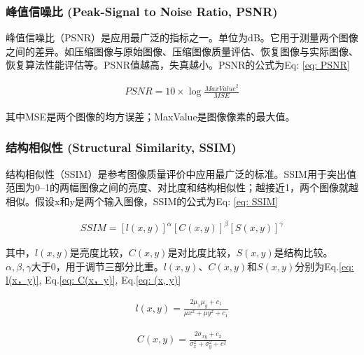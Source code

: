 \documentclass[letterpaper,12pt]{article}
\begin{document}
			\subsubsection{峰值信噪比 (Peak-Signal to Noise Ratio, PSNR)}
		
			峰值信噪比（PSNR）是应用最广泛的指标之一。单位为dB。它用于测量两个图像之间的差异。如压缩图像与原始图像、压缩图像质量评估、恢复图像与实际图像、恢复算法性能评估等。PSNR值越高，失真越小。PSNR的公式为Eq: \ref{eq: PSNR}
			
			\begin{equation}
				\begin{aligned}
					PSNR = 10 \times \log \frac{{MaxValue}^2}{MSE}
				\end{aligned}
				\label{eq: PSNR}
			\end{equation}
			
			其中MSE是两个图像的均方误差；MaxValue是图像像素的最大值。
			
			\subsubsection{结构相似性 (Structural Similarity, SSIM)}
			
			结构相似性（SSIM）是参考图像质量评价中应用最广泛的标准。SSIM用于突出值范围为0–1的两幅图像之间的亮度、对比度和结构相似性；越接近1，两个图像就越相似。假设x和y是两个输入图像，SSIM的公式为Eq: \ref{eq: SSIM}
	
			\begin{equation}
				\begin{aligned}
					SSIM = {\left[ l(x,y) \right]}^{\alpha} {\left[C(x,y)\right]}^\beta {\left[S(x,y)\right]}^\gamma
				\end{aligned}
				\label{eq: SSIM}
			\end{equation}
	
			其中，$l(x,y)$是亮度比较，$C(x,y)$是对比度比较，$S(x,y)$是结构比较。$\alpha, \beta, \gamma$大于$0$，用于调节三部分比重。$l(x, y)$、$C(x, y)$和$S(x, y)$分别为Eq.\ref{eq: l(x，y)}, Eq.\ref{eq: C(x，y)}, Eq.\ref{eq: (x, y)}
			
			\begin{equation}
				\begin{aligned}
					l(x,y)=\frac{2\mu_x \mu_y + c_1}{\mu x^2 + \mu y^2 + c_1}
				\end{aligned}
				\label{eq: l(x，y)}
			\end{equation}
			
			\begin{equation}
				\begin{aligned}
					C(x,y) = \frac{2\sigma_{xy}+c_2}{\sigma_x^2 + \sigma_ y^2 + c^2}
				\end{aligned}
				\label{eq: C(x，y)}
			\end{equation}
			
\end{document}
